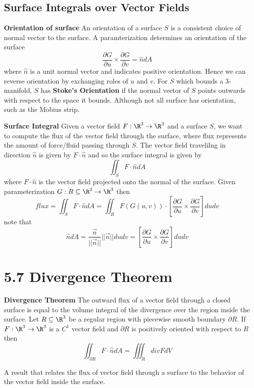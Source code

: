\documentclass[11pt]{article}
\begin{document}
\subsection*{Surface Integrals over Vector Fields}

\begin{defn*}
  \textbf{Orientation of surface} An orientation of a surface $S$ is a consistent choice of normal vector to the surface. A paramterization determines an orientation of the surface
  \[
    \frac{\partial G}{\partial u} \times \frac{\partial G}{\partial v} = \hat{n}dA
  \]
  where $\hat{n}$ is a unit normal vector and indicates positive orientation. Hence we can reverse orientation by exchanging roles of $u$ and $v$. For $S$ which bounds a 3-manifold, $S$ has \textbf{Stoke's Orientation} if the normal vector of $S$ points outwards with respect to the space it bounds. Although not all surface has orientation, such as the Mobius strip.
\end{defn*}


\begin{defn*}
  \textbf{Surface Integral} Given a vector field $F:\R^3 \to \R^3$ and a surface $S$, we want to compute the flux of the vector field through the surface, where flux represents the amount of force/fluid passing through $S$. The vector field travelilng in direction $\hat{n}$ is given by $F \cdot \hat{n}$ and so the surface integral is given by
  \[
    \iint_S F\cdot \hat{n} dA
  \]
  where $F\cdot \hat{n}$ is the vector field projected onto the normal of the surface. Given parameterization $G:R\subseteq\R^2 \to \R^3$ then
  \[
    flux = \iint_S F\cdot \hat{n} dA = \iint_R F(G(u,v))\cdot \left[ \frac{\partial G}{\partial u}\times \frac{\partial G}{\partial v} \right] dudv
  \]
  note that
  \[
    \hat{n}dA = \frac{\vec{n}}{||\vec{n}||} ||\vec{n}||dudv = \left[ \frac{\partial G}{\partial u} \times \frac{\partial G}{\partial v}\right] dudv
  \]
\end{defn*}


\section*{5.7 Divergence Theorem}

\begin{theorem*}
  \textbf{Divergence Theorem} The outward flux of a vector field through a closed surface is equal to the volume integral of the divergence over the region inside the surface. Let $R\subseteq \R^3$ be a regular region with piecewise smooth boundary $\partial R$. If $F: \R^3 \to \R^3$ is a $C^1$ vector field and $\partial R$ is positively oriented with respect to $R$ then
  \[
    \iint_{\partial R} F \cdot \hat{n} dA = \iiint _R div F dV
  \]
  \begin{rem}
    A result that relates the flux of vector field through a surface to the behavior of the vector field inside the surface.
  \end{rem}
\end{theorem*}
\end{document}
